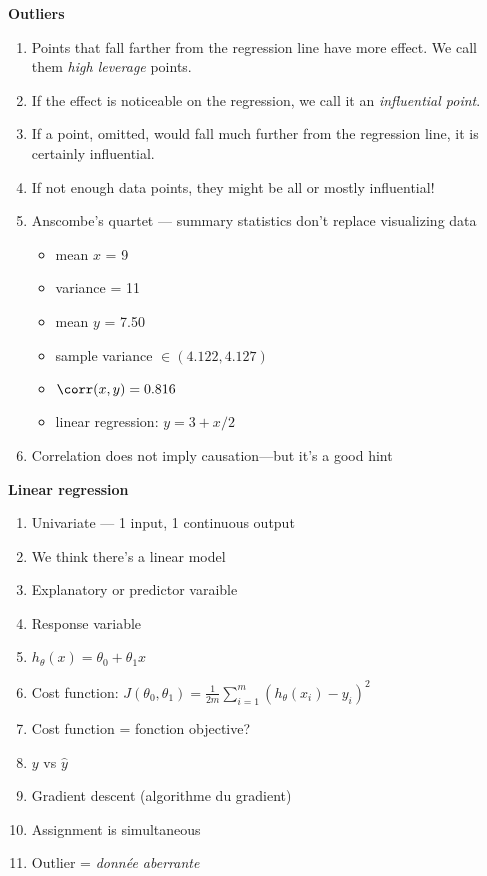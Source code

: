 \textbf{Outliers}
\begin{enumerate}
\item Points that fall farther from the regression line have more
  effect.  We call them \textit{high leverage} points.
\item If the effect is noticeable on the regression, we call it an
  \textit{influential point}.
\item If a point, omitted, would fall much further from the regression
  line, it is certainly influential.
\item If not enough data points, they might be all or mostly
  influential!
\item Anscombe's quartet --- summary statistics don't replace visualizing data
  \begin{itemize}
  \item mean $x$ = 9
  \item variance = 11
  \item mean $y$ = 7.50
  \item sample variance $\in (4.122, 4.127)$
  \item $\corr(x,y) = 0.816$
  \item linear regression: $y=3 + x/2$
  \end{itemize}
\item Correlation does not imply causation---but it's a good hint
\end{enumerate}

\textbf{Linear regression}
\begin{enumerate}
\item Univariate --- 1 input, 1 continuous output
\item We think there's a linear model
\item Explanatory or predictor varaible
\item Response variable
\item $h_\theta(x) = \theta_0 + \theta_1 x$
\item Cost function: $J(\theta_0, \theta_1) = \frac{1}{2m} \sum_{i=1}^m (h_\theta(x_i) - y_i)^2$
\item Cost function = fonction objective?
\item $y$ vs $\hat{y}$
\item Gradient descent (algorithme du gradient)
\item Assignment is simultaneous
\item Outlier = \textit{donnée aberrante}
\end{enumerate}

